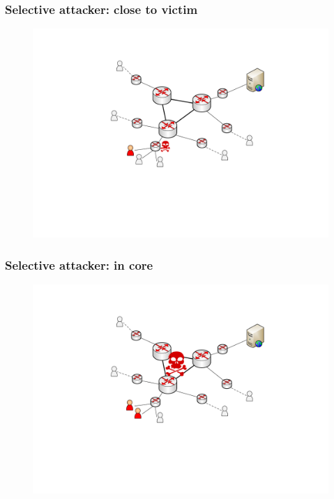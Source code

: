 \begin{frame}
\frametitle{Selective attacker: close to victim}
\begin{block}{}
  \begin{figure}[t]
    \centering
    \includegraphics[scale=.5]{figures/scenario3-close-to-ap-selective.pdf}
  \end{figure}
\end{block}
\end{frame}

\begin{frame}
\frametitle{Selective attacker: in core}
\begin{block}{}
  \begin{figure}[t]
    \centering
    \includegraphics[scale=.5]{figures/scenario4-core-selective.pdf}
  \end{figure}
\end{block}
\end{frame}



